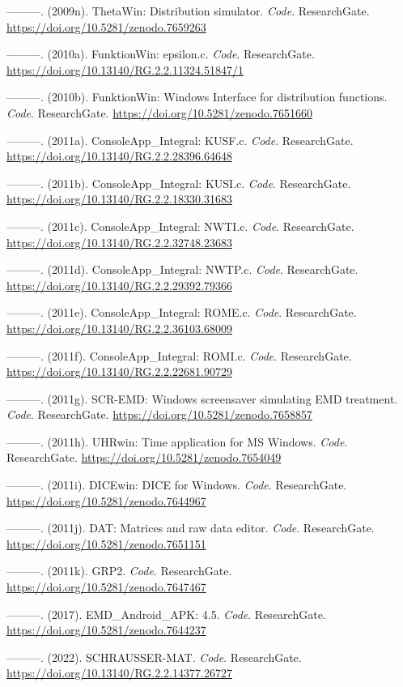 \documentclass[
]{article}
\begin{document}
---------. (2009n). ThetaWin: Distribution simulator. \emph{Code}.
ResearchGate. \url{https://doi.org/10.5281/zenodo.7659263}

---------. (2010a). FunktionWin: epsilon.c. \emph{Code}. ResearchGate.
\url{https://doi.org/10.13140/RG.2.2.11324.51847/1}

---------. (2010b). FunktionWin: Windows Interface for distribution
functions. \emph{Code}. ResearchGate.
\url{https://doi.org/10.5281/zenodo.7651660}

---------. (2011a). ConsoleApp\_Integral: KUSF.c. \emph{Code}.
ResearchGate. \url{https://doi.org/10.13140/RG.2.2.28396.64648}

---------. (2011b). ConsoleApp\_Integral: KUSI.c. \emph{Code}.
ResearchGate. \url{https://doi.org/10.13140/RG.2.2.18330.31683}

---------. (2011c). ConsoleApp\_Integral: NWTI.c. \emph{Code}.
ResearchGate. \url{https://doi.org/10.13140/RG.2.2.32748.23683}

---------. (2011d). ConsoleApp\_Integral: NWTP.c. \emph{Code}.
ResearchGate. \url{https://doi.org/10.13140/RG.2.2.29392.79366}

---------. (2011e). ConsoleApp\_Integral: ROME.c. \emph{Code}.
ResearchGate. \url{https://doi.org/10.13140/RG.2.2.36103.68009}

---------. (2011f). ConsoleApp\_Integral: ROMI.c. \emph{Code}.
ResearchGate. \url{https://doi.org/10.13140/RG.2.2.22681.90729}

---------. (2011g). SCR-EMD: Windows screensaver simulating EMD
treatment. \emph{Code}. ResearchGate.
\url{https://doi.org/10.5281/zenodo.7658857}

---------. (2011h). UHRwin: Time application for MS Windows.
\emph{Code}. ResearchGate. \url{https://doi.org/10.5281/zenodo.7654049}

---------. (2011i). DICEwin: DICE for Windows. \emph{Code}.
ResearchGate. \url{https://doi.org/10.5281/zenodo.7644967}

---------. (2011j). DAT: Matrices and raw data editor. \emph{Code}.
ResearchGate. \url{https://doi.org/10.5281/zenodo.7651151}

---------. (2011k). GRP2. \emph{Code}. ResearchGate.
\url{https://doi.org/10.5281/zenodo.7647467}

---------. (2017). EMD\_Android\_APK: 4.5. \emph{Code}. ResearchGate.
\url{https://doi.org/10.5281/zenodo.7644237}

---------. (2022). SCHRAUSSER-MAT. \emph{Code}. ResearchGate.
\url{https://doi.org/10.13140/RG.2.2.14377.26727}
\end{document}

